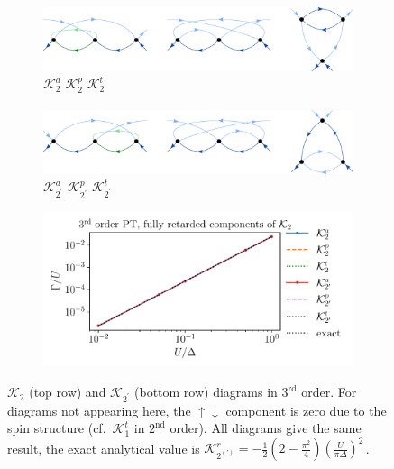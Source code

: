 \documentclass[10pt]{scrartcl}
\newcommand{\Ktot}[1]{\mathcal{K}_#1}
\newcommand{\K}[2]{\mathcal{K}_#1^#2}
\newcommand{\Kb}[2]{\mathcal{K}_{#1^\prime}^{#2}}
\begin{document}
\begin{figure}[h!]
\begin{subfigure}[c]{0.4\textwidth}
\includegraphics[scale=0.3]{diagrams/PT3_K2}
\\
\phantom{.}\hspace{0.75cm} $\K2a$ \hspace{2cm} $\K2p$ \hspace{1.5cm} $\K2t$
\\ \\
\includegraphics[scale=0.3]{diagrams/PT3_K2b}
\\
\phantom{.}\hspace{0.75cm} $\Kb2a$ \hspace{1.9cm} $\Kb2p$ \hspace{1.4cm} $\Kb2t$
\end{subfigure}
\begin{subfigure}[c]{0.4\textwidth}
\includegraphics[scale=0.65]{plots/PT3_K2}
\end{subfigure}
\caption{$\Ktot2$ (top row) and $\Ktot{{2^\prime}}$ (bottom row) diagrams in $3^\text{rd}$ order. For diagrams not appearing here, the $\uparrow\downarrow$ component is zero due to the spin structure (cf.~$\K1t$ in $2^\text{nd}$ order). All diagrams give the same result, the exact analytical value is $\K{{2^{(\prime)}}}{r}=-\frac{1}{2}(2\!-\!\frac{\pi^2}{4})(\frac{U}{\pi\Delta})^2$\,.}
\end{figure}
\end{document}
